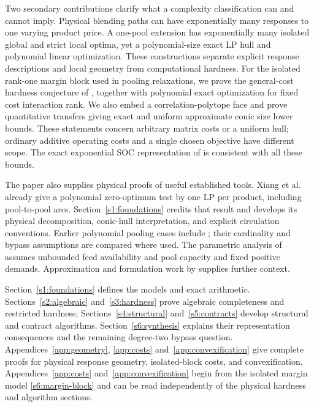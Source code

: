Two secondary contributions clarify what a complexity classification
can and cannot imply. Physical blending paths can have exponentially
many responses to one varying product price. A one-pool extension has
exponentially many isolated global and strict local optima, yet a
polynomial-size exact LP hull and polynomial linear optimization.
These constructions separate explicit response descriptions and local
geometry from computational hardness. For the isolated rank-one margin
block used in pooling relaxations, we prove the general-cost hardness
conjecture of \citet{dey2020-convexifications-of-rank-one-based}, together
with polynomial exact optimization for fixed cost interaction rank.
We also embed a correlation-polytope face and prove quantitative
transfers giving exact and uniform approximate conic size lower bounds.
These statements concern arbitrary matrix costs or a uniform hull;
ordinary additive operating costs and a single chosen objective have
different scope. The exact exponential SOC representation of
\citet{s6:jalilian2026} is consistent with all these bounds.

The paper also supplies physical proofs of useful established tools.
Xiang et al.\ \cite{xiang2026-dive-and-fix} already give a polynomial
zero-optimum test by one LP per product, including pool-to-pool arcs.
Section~\ref{s1:foundations} credits that result and develops its
physical decomposition, conic-hull interpretation, and explicit
circulation conventions.
Earlier polynomial pooling cases include
\citet{s3:haugland-hendrix2016,s4:boland2017}; their cardinality and
bypass assumptions are compared where used. The parametric analysis of
\citet{s3:baltean2018} assumes unbounded feed availability and pool
capacity and fixed positive demands. Approximation and formulation work
by \citet{dey2015-analysis-of-milp-techniques-for,
gupte2017-relaxations-and-discretizations-for-the,
dey2020-convexifications-of-rank-one-based} supplies further context.

Section~\ref{s1:foundations} defines the models and exact arithmetic.
Sections~\ref{s2:algebraic} and~\ref{s3:hardness} prove algebraic
completeness and restricted hardness; Sections~\ref{s4:structural}
and~\ref{s5:contracts} develop structural and contract algorithms.
Section~\ref{s6:synthesis} explains their representation consequences
and the remaining degree-two bypass question. Appendices~\ref{app:geometry},
\ref{app:costs} and~\ref{app:convexification} give complete proofs for
physical response geometry, isolated-block costs, and convexification.
Appendices~\ref{app:costs} and~\ref{app:convexification} begin from
the isolated margin model \eqref{s6:margin-block} and can be read
independently of the physical hardness and algorithm sections.
